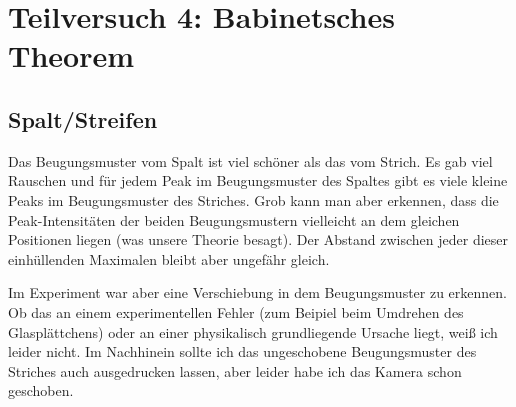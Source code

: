 \section{Teilversuch 4: Babinetsches Theorem}
 	\subsection{Spalt/Streifen}
 		Das Beugungsmuster vom Spalt ist viel schöner als das vom Strich. Es gab viel Rauschen und für jedem Peak im Beugungsmuster des Spaltes gibt es viele kleine Peaks im Beugungsmuster des Striches. Grob kann man aber erkennen, dass die Peak-Intensitäten der beiden Beugungsmustern vielleicht an dem gleichen Positionen liegen (was unsere Theorie besagt). Der Abstand zwischen jeder dieser einhüllenden Maximalen bleibt aber ungefähr gleich.

 		Im Experiment war aber eine Verschiebung in dem Beugungsmuster zu erkennen. Ob das an einem experimentellen Fehler (zum Beipiel beim Umdrehen des Glasplättchens) oder an einer physikalisch grundliegende Ursache liegt, weiß ich leider nicht. Im Nachhinein sollte ich das ungeschobene Beugungsmuster des Striches auch ausgedrucken lassen, aber leider habe ich das Kamera schon geschoben.

